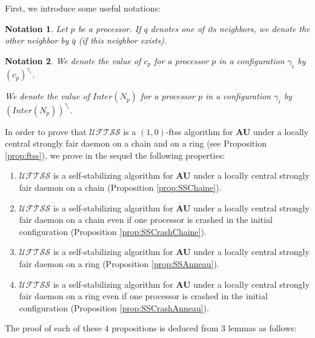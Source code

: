 \documentclass[11pt,english,letterpaper]{article}
\newtheorem{notation}{Notation}
\begin{document}
First, we introduce some useful notations:

\begin{notation}
Let $p$ be a processor. If $q$ denotes one of its neighbors, we denote the other neighbor by $\bar{q}$ (if this neighbor exists). 
\end{notation}

\begin{notation}
We denote the value of $c_{p}$ for a processor $p$ in a configuration $\gamma_{i}$ by $\left(c_{p}\right)^{\gamma_{i}}$.

We denote the value of $Inter(N_{p})$ for a processor $p$ in a configuration $\gamma_{i}$ by $\left(Inter(N_{p})\right)^{\gamma_{i}}$.
\end{notation}

In order to prove that $\mathcal{UFTSS}$ is a $(1,0)$-ftss algorithm for \textbf{AU} under a locally central strongly fair daemon on a chain and on a ring (see Proposition \ref{prop:ftss}), we prove in the sequel the following properties:

\begin{enumerate}
\item $\mathcal{UFTSS}$ is a self-stabilizing algorithm for \textbf{AU} under a locally central strongly fair daemon on a chain (Proposition \ref{prop:SSChaine}).
\item $\mathcal{UFTSS}$ is a self-stabilizing algorithm for \textbf{AU} under a locally central strongly fair daemon on a chain even if one processor is crashed in the initial configuration (Proposition \ref{prop:SSCrashChaine}).
\item $\mathcal{UFTSS}$ is a self-stabilizing algorithm for \textbf{AU} under a locally central strongly fair daemon on a ring (Proposition \ref{prop:SSAnneau}).
\item $\mathcal{UFTSS}$ is a self-stabilizing algorithm for \textbf{AU} under a locally central strongly fair daemon on a ring even if one processor is crashed in the initial configuration (Proposition \ref{prop:SSCrashAnneau}).
\end{enumerate}

The proof of each of these 4 propositions is deduced from 3 lemmas as follows:
\end{document}
